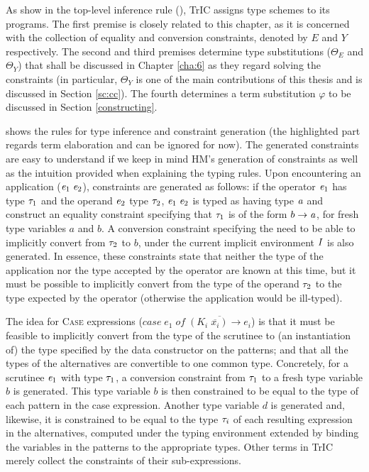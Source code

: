 As show in the top-level inference rule (), TrIC assigns type schemes to its programs. The first premise is closely related to this chapter, as it is concerned with the collection of equality and conversion constraints, denoted by $E$ and $Y$ respectively. The second and third premises determine type substitutions ($\Theta_E$ and $\Theta_Y$) that shall be discussed in Chapter \ref{cha:6} as they regard solving the constraints (in particular, $\Theta_Y$ is one of the main contributions of this thesis and is discussed in Section \ref{sc:cc}). The fourth determines a term substitution $\varphi$ to be discussed in Section \ref{constructing}.

 shows the rules for type inference and constraint generation (the highlighted part regards term elaboration and can be ignored for now). The generated constraints are easy to understand if we keep in mind HM's generation of constraints as well as the intuition provided when explaining the typing rules. Upon encountering an application ($\mathit{e}_1\;\mathit{e}_2$), constraints are generated as follows: if the operator $\mathit{e}_1$ has type $\mathit{\tau}_1$ and the operand $\mathit{e}_2$ type $\mathit{\tau}_2$, $\mathit{e}_1\;\mathit{e}_2$ is typed as having type $\mathit{a}$ and construct an equality constraint specifying that $\mathit{\tau}_1$ is of the form $b \to \mathit{a}$, for fresh type variables $a$ and $b$. A conversion constraint specifying the need to be able to implicitly convert from $\mathit{\tau}_2$ to $b$, under the current implicit environment $I$ is also generated. In essence, these constraints state that neither the type of the application nor the type accepted by the operator are known at this time, but it must be possible to implicitly convert from the type of the operand $\mathit{\tau}_2$ to the type expected by the operator (otherwise the application would be ill-typed).

The idea for \textsc{Case} expressions ($case\;e_1\;of\;\overline{(K_i\;\overline{x_i})\rightarrow e_i}$) is that it must be feasible to implicitly convert from the type of the scrutinee to (an instantiation of) the type specified by the data constructor on the patterns; and that all the types of the alternatives are convertible to one common type. Concretely, for a scrutinee  $\mathit{e}_1$ with type $\mathit{\tau}_1$, a conversion constraint from $\mathit{\tau}_1$ to a fresh type variable $b$ is generated. This type variable $b$ is then constrained to be equal to the type of each pattern in the case expression. Another type variable $d$ is generated and, likewise, it is constrained to be equal to the type $\mathit{\tau}_i$ of each resulting expression in the alternatives, computed under the typing environment extended by binding the variables in the patterns to the appropriate types. Other terms in TrIC merely collect the constraints of their sub-expressions.

